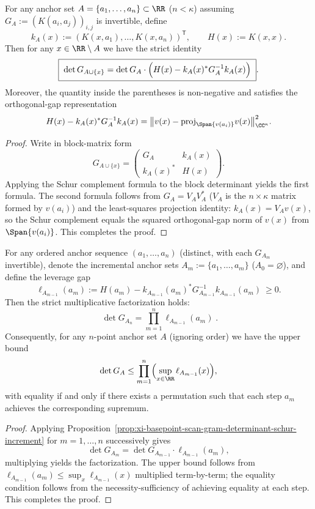 \begin{proposition}\label{prop:xi-basepoint-scan-gram-determinant-schur-increment}
For any anchor set \(A=\{a_1,\dots,a_n\}\subset\RR\) (\(n<\kappa\)) assuming \(G_A:=(K(a_i,a_j))_{i,j}\) is invertible, define
\[
k_A(x):=(K(x,a_1),\dots,K(x,a_n))^{\mathsf T},\qquad
H(x):=K(x,x).
\]
Then for any \(x\in\RR\setminus A\) we have the strict identity
\[
\boxed{\;
\det G_{A\cup\{x\}}=\det G_A\cdot\Bigl(H(x)-k_A(x)^\ast G_A^{-1}k_A(x)\Bigr)\; } .
\]
Moreover, the quantity inside the parentheses is non-negative and satisfies the orthogonal-gap representation
\[
H(x)-k_A(x)^\ast G_A^{-1}k_A(x)
=\bigl\|v(x)-\mathrm{proj}_{\Span\{v(a_i)\}}v(x)\bigr\|_{\CC^\kappa}^{2}.
\]
\end{proposition}
\begin{proof}
Write in block-matrix form
\[
G_{A\cup\{x\}}=
\begin{pmatrix}
G_A & k_A(x)\\
k_A(x)^\ast & H(x)
\end{pmatrix}.
\]
Applying the Schur complement formula to the block determinant yields the first formula.
The second formula follows from \(G_A=V_AV_A^\ast\) (\(V_A\) is the \(n\times\kappa\) matrix formed by \(v(a_i)\)) and the least-squares projection identity:
\(
k_A(x)=V_A v(x)
\), so the Schur complement equals the squared orthogonal-gap norm of \(v(x)\) from \(\Span\{v(a_i)\}\). This completes the proof.
\end{proof}
\begin{corollary}\label{cor:xi-basepoint-scan-gram-determinant-leverage-product}
For any ordered anchor sequence \((a_1,\dots,a_n)\) (distinct, with each \(G_{A_m}\) invertible), denote the incremental anchor sets \(A_m:=\{a_1,\dots,a_m\}\) (\(A_0=\varnothing\)), and define the leverage gap
\[
\ell_{A_{m-1}}(a_m):=
H(a_m)-k_{A_{m-1}}(a_m)^\ast G_{A_{m-1}}^{-1}k_{A_{m-1}}(a_m)\ \ge 0.
\]
Then the strict multiplicative factorization holds:
\[
\boxed{\;
\det G_{A_n}=\prod_{m=1}^{n}\ell_{A_{m-1}}(a_m)\; }.
\]
Consequently, for any \(n\)-point anchor set \(A\) (ignoring order) we have the upper bound
\[
\det G_A\le \prod_{m=1}^{n}\Bigl(\sup_{x\in\RR}\ell_{A_{m-1}}(x)\Bigr),
\]
with equality if and only if there exists a permutation such that each step \(a_m\) achieves the corresponding supremum.
\end{corollary}
\begin{proof}
Applying Proposition~\ref{prop:xi-basepoint-scan-gram-determinant-schur-increment} for \(m=1,\dots,n\) successively gives
\[
\det G_{A_m}=\det G_{A_{m-1}}\cdot \ell_{A_{m-1}}(a_m),
\]
multiplying yields the factorization.
The upper bound follows from \(\ell_{A_{m-1}}(a_m)\le \sup_x\ell_{A_{m-1}}(x)\) multiplied term-by-term; the equality condition follows from the necessity-sufficiency of achieving equality at each step. This completes the proof.
\end{proof}



